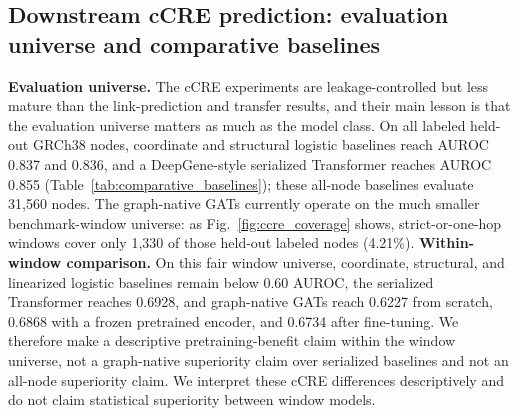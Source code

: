 \IfFileExists{ws-procs11x85.cls}{\worldscientificclasstrue\documentclass{ws-procs11x85}}{\worldscientificclassfalse\documentclass[11pt]{article}\usepackage[margin=1in]{geometry}}
\begin{document}
\FloatBarrier

\subsection{Downstream cCRE prediction: evaluation universe and comparative
baselines}
\label{sec:ccre}

\textbf{Evaluation universe.} The cCRE experiments are leakage-controlled but
less mature than the link-prediction and transfer results, and their main lesson
is that the evaluation universe matters as much as the model class. On all
labeled held-out GRCh38 nodes, coordinate and structural logistic baselines
reach AUROC 0.837 and 0.836, and a DeepGene-style serialized Transformer reaches
AUROC 0.855 (Table~\ref{tab:comparative_baselines}); these all-node baselines
evaluate 31{,}560 nodes. The graph-native GATs currently operate on the much
smaller benchmark-window universe: as Fig.~\ref{fig:ccre_coverage} shows,
strict-or-one-hop windows cover only 1{,}330 of those held-out labeled nodes
(4.21\%). \textbf{Within-window comparison.} On this fair window universe,
coordinate, structural, and linearized logistic baselines remain below 0.60
AUROC, the serialized Transformer reaches 0.6928, and graph-native GATs reach
0.6227 from scratch, 0.6868 with a frozen pretrained encoder, and 0.6734 after
fine-tuning. We therefore make a descriptive pretraining-benefit claim within
the window universe, not a graph-native superiority claim over serialized
baselines and not an all-node superiority claim. We interpret these cCRE
differences descriptively and do not claim statistical superiority between
window models.
\end{document}
